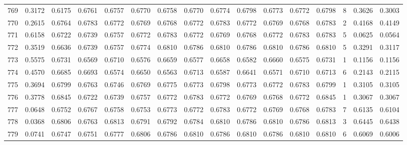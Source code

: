 \begin{tabular}{lrrrrrrrrrrrrrrr}
769 &      0.3172 &  0.6175 &  0.6761 &  0.6757 &  0.6770 &  0.6758 &  0.6770 &  0.6774 &  0.6798 &  0.6773 &   0.6772 &     0.6798 &      8 &                    0.3626 &                     0.3003 \\
770 &      0.2615 &  0.6764 &  0.6783 &  0.6772 &  0.6769 &  0.6768 &  0.6772 &  0.6783 &  0.6772 &  0.6769 &   0.6768 &     0.6783 &      2 &                    0.4168 &                     0.4149 \\
771 &      0.6158 &  0.6722 &  0.6739 &  0.6757 &  0.6772 &  0.6783 &  0.6772 &  0.6769 &  0.6768 &  0.6772 &   0.6783 &     0.6783 &      5 &                    0.0625 &                     0.0564 \\
772 &      0.3519 &  0.6636 &  0.6739 &  0.6757 &  0.6774 &  0.6810 &  0.6786 &  0.6810 &  0.6786 &  0.6810 &   0.6786 &     0.6810 &      5 &                    0.3291 &                     0.3117 \\
773 &      0.5575 &  0.6731 &  0.6569 &  0.6710 &  0.6576 &  0.6659 &  0.6577 &  0.6658 &  0.6582 &  0.6660 &   0.6575 &     0.6731 &      1 &                    0.1156 &                     0.1156 \\
774 &      0.4570 &  0.6685 &  0.6693 &  0.6574 &  0.6650 &  0.6563 &  0.6713 &  0.6587 &  0.6641 &  0.6571 &   0.6710 &     0.6713 &      6 &                    0.2143 &                     0.2115 \\
775 &      0.3694 &  0.6799 &  0.6763 &  0.6746 &  0.6769 &  0.6775 &  0.6773 &  0.6798 &  0.6773 &  0.6772 &   0.6783 &     0.6799 &      1 &                    0.3105 &                     0.3105 \\
776 &      0.3778 &  0.6845 &  0.6722 &  0.6739 &  0.6757 &  0.6772 &  0.6783 &  0.6772 &  0.6769 &  0.6768 &   0.6772 &     0.6845 &      1 &                    0.3067 &                     0.3067 \\
777 &      0.0648 &  0.6752 &  0.6767 &  0.6758 &  0.6753 &  0.6773 &  0.6772 &  0.6783 &  0.6772 &  0.6769 &   0.6768 &     0.6783 &      7 &                    0.6135 &                     0.6104 \\
778 &      0.0368 &  0.6806 &  0.6763 &  0.6813 &  0.6791 &  0.6792 &  0.6784 &  0.6810 &  0.6786 &  0.6810 &   0.6786 &     0.6813 &      3 &                    0.6445 &                     0.6438 \\
779 &      0.0741 &  0.6747 &  0.6751 &  0.6777 &  0.6806 &  0.6786 &  0.6810 &  0.6786 &  0.6810 &  0.6786 &   0.6810 &     0.6810 &      6 &                    0.6069 &                     0.6006 \\

\end{tabular}

